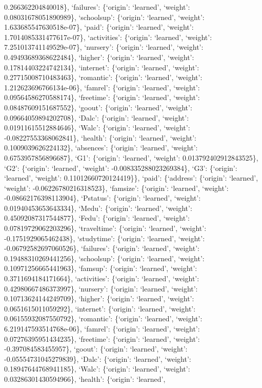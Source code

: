 \documentclass[
]{article}
\begin{document}
0.266362204840018\}, `failures': \{`origin': `learned', `weight':
0.08031678051890989\}, `schoolsup': \{`origin': `learned', `weight':
1.633685547630518e-07\}, `paid': \{`origin': `learned', `weight':
1.7014085331477617e-07\}, `activities': \{`origin': `learned', `weight':
7.251013741149529e-07\}, `nursery': \{`origin': `learned', `weight':
0.49493689368622484\}, `higher': \{`origin': `learned', `weight':
0.17814403224742134\}, `internet': \{`origin': `learned', `weight':
0.27715008710483463\}, `romantic': \{`origin': `learned', `weight':
1.212623696766134e-06\}, `famrel': \{`origin': `learned', `weight':
0.09564586270588174\}, `freetime': \{`origin': `learned', `weight':
0.08487609151687552\}, `goout': \{`origin': `learned', `weight':
0.09664059894202708\}, `Dalc': \{`origin': `learned', `weight':
0.01911615512884646\}, `Walc': \{`origin': `learned', `weight':
-0.08227553368062841\}, `health': \{`origin': `learned', `weight':
0.1009039626224132\}, `absences': \{`origin': `learned', `weight':
0.6753957856896687\}, `G1': \{`origin': `learned', `weight':
0.013792402912843525\}, `G2': \{`origin': `learned', `weight':
-0.008335288023269384\}, `G3': \{`origin': `learned', `weight':
0.11012660720124419\}\}, `paid': \{`address': \{`origin': `learned',
`weight': -0.06226780216318523\}, `famsize': \{`origin': `learned',
`weight': -0.08662176398113904\}, `Pstatus': \{`origin': `learned',
`weight': 0.01940453653643334\}, `Medu': \{`origin': `learned',
`weight': 0.45092087317544877\}, `Fedu': \{`origin': `learned',
`weight': 0.07819729062203296\}, `traveltime': \{`origin': `learned',
`weight': -0.1751929065462438\}, `studytime': \{`origin': `learned',
`weight': -0.06792582697060526\}, `failures': \{`origin': `learned',
`weight': 0.19488310269441256\}, `schoolsup': \{`origin': `learned',
`weight': 0.10971256665441963\}, `famsup': \{`origin': `learned',
`weight': 0.3711694184171664\}, `activities': \{`origin': `learned',
`weight': 0.42980667486373997\}, `nursery': \{`origin': `learned',
`weight': 0.10713624144249709\}, `higher': \{`origin': `learned',
`weight': 0.0651615011059292\}, `internet': \{`origin': `learned',
`weight': 0.06155932087550792\}, `romantic': \{`origin': `learned',
`weight': 6.219147593514768e-06\}, `famrel': \{`origin': `learned',
`weight': 0.07276395951434235\}, `freetime': \{`origin': `learned',
`weight': -0.397084583455957\}, `goout': \{`origin': `learned',
`weight': -0.05554731045279839\}, `Dalc': \{`origin': `learned',
`weight': 0.18947644768941185\}, `Walc': \{`origin': `learned',
`weight': 0.03286301430594966\}, `health': \{`origin': `learned',
\end{document}
